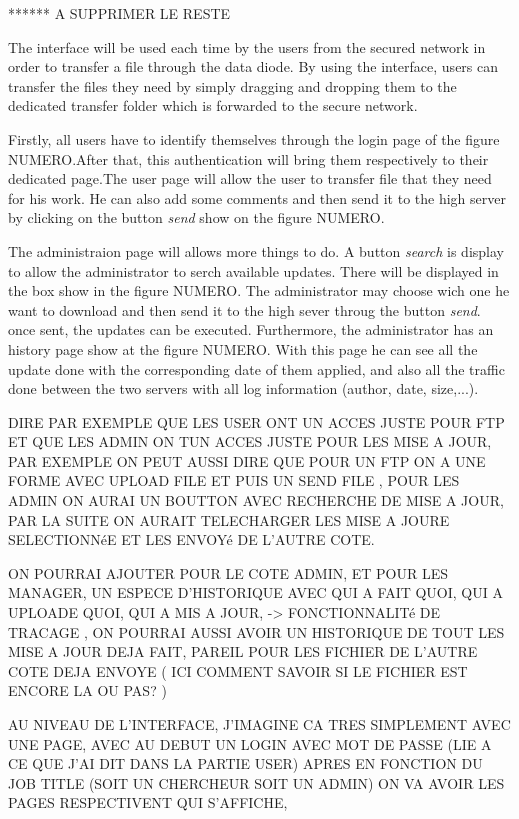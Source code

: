 \documentclass[a4paper,10pt]{article}
\begin{document}
******
A SUPPRIMER LE RESTE


The interface will be used each time by the users from the secured network
in order to transfer a file through the data diode. By using the interface,
users can transfer the files they need by simply dragging and dropping them to
the dedicated transfer folder which is forwarded to the secure network.





Firstly, all users have to identify themselves through the login page of the figure NUMERO.After that, this authentication will bring them respectively to their dedicated page.The user page will allow the user to transfer file that they need for his work. He can also add some comments and then send it to the high server by clicking on the button \textit{send} show on the figure NUMERO.

The administraion page will allows more things to do. A button \textit{search} is display to allow the administrator to serch available updates. There will be displayed in the box show in the figure NUMERO. The administrator may choose wich one he want to download and then send it to the high sever throug the button \textit{send}. once sent, the updates can be executed.
Furthermore, the administrator has an history page show at the figure NUMERO. With this page he can see all the update done with the corresponding date of them applied, and also all the traffic done between the two servers with all log information (author, date, size,...).

DIRE PAR EXEMPLE QUE LES USER ONT UN ACCES JUSTE POUR FTP ET QUE LES ADMIN ON TUN ACCES JUSTE POUR LES MISE A JOUR, PAR EXEMPLE ON PEUT AUSSI DIRE QUE POUR UN FTP ON A UNE FORME AVEC UPLOAD FILE ET PUIS UN SEND FILE , POUR LES ADMIN ON AURAI UN BOUTTON AVEC RECHERCHE DE MISE A JOUR, PAR LA SUITE ON AURAIT TELECHARGER LES MISE A JOURE SELECTIONNéE ET LES ENVOYé DE L'AUTRE COTE. 

ON POURRAI AJOUTER POUR LE COTE ADMIN, ET POUR LES MANAGER, UN ESPECE D'HISTORIQUE AVEC QUI A FAIT QUOI, QUI A UPLOADE QUOI, QUI A MIS A JOUR, -> FONCTIONNALITé DE TRACAGE , ON POURRAI AUSSI AVOIR UN HISTORIQUE DE TOUT LES MISE A JOUR DEJA FAIT, PAREIL POUR LES FICHIER DE L'AUTRE COTE DEJA ENVOYE ( ICI COMMENT SAVOIR SI LE FICHIER EST ENCORE LA OU PAS? )


AU NIVEAU DE L'INTERFACE, J'IMAGINE CA TRES SIMPLEMENT AVEC UNE PAGE, AVEC AU DEBUT UN LOGIN AVEC MOT DE PASSE (LIE A CE QUE J'AI DIT DANS LA PARTIE USER) APRES EN FONCTION DU JOB TITLE (SOIT UN CHERCHEUR SOIT UN ADMIN) ON VA AVOIR LES PAGES RESPECTIVENT QUI S'AFFICHE, 
\end{document}
